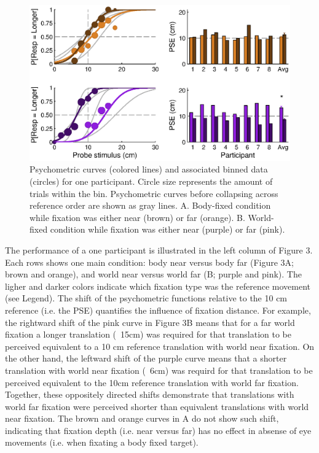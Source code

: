 
\begin{figure}
    \includegraphics[width=1.0\textwidth]{src/paper4/paper4_figure3.eps}

	\caption{Psychometric curves (colored lines) and associated binned data (circles) for one participant. Circle size represents the amount of trials within the bin. Psychometric curves before collapsing across reference order are shown as gray lines. A.  Body-fixed condition while fixation was either near (brown) or far (orange). B. World-fixed condition while fixation was either near (purple) or far (pink).}
	\label{p4:fig3}
\end{figure}


The performance of a one participant is illustrated in the left column of Figure 3. Each rows shows one main condition: body near versus body far (Figure 3A; brown and orange), and world near versus world far (B; purple and pink). The ligher and darker colors indicate which fixation type was the reference movement (see Legend). The shift of the psychometric functions relative to the 10 \si{\centi\metre} reference (i.e. the PSE) quantifies the influence of fixation distance. For example, the rightward shift of the pink curve in Figure 3B means that for a far world fixation a longer translation (~15cm) was required for that translation to be perceived equivalent to a 10 \si{\centi\metre} reference translation with world near fixation. On the other hand, the leftward shift of the purple curve means that a shorter translation with world near fixation (~6cm) was requird for that translation to be perceived equivalent to the 10cm reference translation with world far fixation. Together, these oppositely directed shifts demonstrate that translations with world far fixation were perceived shorter than equivalent translations with world near fixation. The brown and orange curves in A do not show such shift, indicating that fixation depth (i.e. near versus far) has no effect in absense of eye movements (i.e. when fixating a body fixed target).

